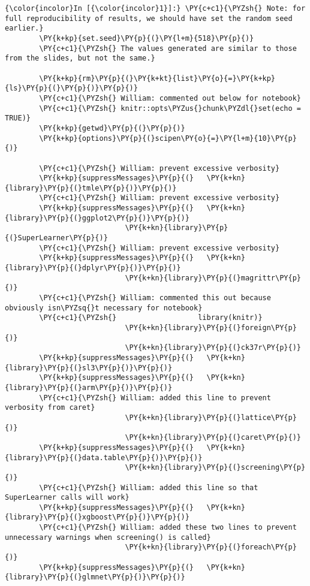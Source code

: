   \begin{Verbatim}[commandchars=\\\{\}]
{\color{incolor}In [{\color{incolor}1}]:} \PY{c+c1}{\PYZsh{} Note: for full reproducibility of results, we should have set the random seed earlier.}
        \PY{k+kp}{set.seed}\PY{p}{(}\PY{l+m}{518}\PY{p}{)}
        \PY{c+c1}{\PYZsh{} The values generated are similar to those from the slides, but not the same.}
        
        \PY{k+kp}{rm}\PY{p}{(}\PY{k+kt}{list}\PY{o}{=}\PY{k+kp}{ls}\PY{p}{(}\PY{p}{)}\PY{p}{)}
        \PY{c+c1}{\PYZsh{} William: commented out below for notebook}
        \PY{c+c1}{\PYZsh{} knitr::opts\PYZus{}chunk\PYZdl{}set(echo = TRUE)}
        \PY{k+kp}{getwd}\PY{p}{(}\PY{p}{)}
        \PY{k+kp}{options}\PY{p}{(}scipen\PY{o}{=}\PY{l+m}{10}\PY{p}{)}
        
        \PY{c+c1}{\PYZsh{} William: prevent excessive verbosity}
        \PY{k+kp}{suppressMessages}\PY{p}{(}   \PY{k+kn}{library}\PY{p}{(}tmle\PY{p}{)}\PY{p}{)}
        \PY{c+c1}{\PYZsh{} William: prevent excessive verbosity}
        \PY{k+kp}{suppressMessages}\PY{p}{(}   \PY{k+kn}{library}\PY{p}{(}ggplot2\PY{p}{)}\PY{p}{)}
                            \PY{k+kn}{library}\PY{p}{(}SuperLearner\PY{p}{)}
        \PY{c+c1}{\PYZsh{} William: prevent excessive verbosity}
        \PY{k+kp}{suppressMessages}\PY{p}{(}   \PY{k+kn}{library}\PY{p}{(}dplyr\PY{p}{)}\PY{p}{)}
                            \PY{k+kn}{library}\PY{p}{(}magrittr\PY{p}{)}
        \PY{c+c1}{\PYZsh{} William: commented this out because obviously isn\PYZsq{}t necessary for notebook}
        \PY{c+c1}{\PYZsh{}                   library(knitr)}
                            \PY{k+kn}{library}\PY{p}{(}foreign\PY{p}{)}
                            \PY{k+kn}{library}\PY{p}{(}ck37r\PY{p}{)}
        \PY{k+kp}{suppressMessages}\PY{p}{(}   \PY{k+kn}{library}\PY{p}{(}sl3\PY{p}{)}\PY{p}{)}
        \PY{k+kp}{suppressMessages}\PY{p}{(}   \PY{k+kn}{library}\PY{p}{(}arm\PY{p}{)}\PY{p}{)}
        \PY{c+c1}{\PYZsh{} William: added this line to prevent verbosity from caret}
                            \PY{k+kn}{library}\PY{p}{(}lattice\PY{p}{)}
                            \PY{k+kn}{library}\PY{p}{(}caret\PY{p}{)}
        \PY{k+kp}{suppressMessages}\PY{p}{(}   \PY{k+kn}{library}\PY{p}{(}data.table\PY{p}{)}\PY{p}{)}
                            \PY{k+kn}{library}\PY{p}{(}screening\PY{p}{)}
        \PY{c+c1}{\PYZsh{} William: added this line so that SuperLearner calls will work}
        \PY{k+kp}{suppressMessages}\PY{p}{(}   \PY{k+kn}{library}\PY{p}{(}xgboost\PY{p}{)}\PY{p}{)}
        \PY{c+c1}{\PYZsh{} William: added these two lines to prevent unnecessary warnings when screening() is called}
                            \PY{k+kn}{library}\PY{p}{(}foreach\PY{p}{)}
        \PY{k+kp}{suppressMessages}\PY{p}{(}   \PY{k+kn}{library}\PY{p}{(}glmnet\PY{p}{)}\PY{p}{)}
\end{Verbatim}

